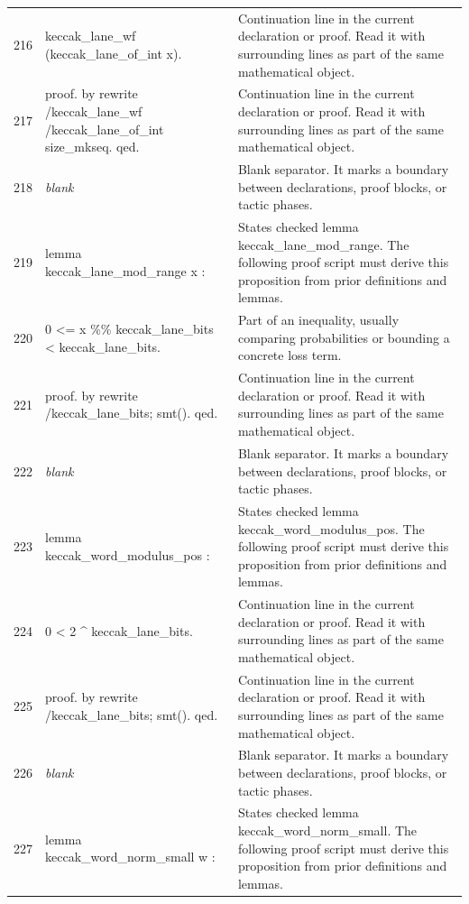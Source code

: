 \documentclass[10pt]{article}
\begin{document}
\begin{longtable}{r L{0.53\textwidth} L{0.37\textwidth}}
216 & {\ttfamily\scriptsize   keccak\_lane\_wf (keccak\_lane\_of\_int x).} & Continuation line in the current declaration or proof.  Read it with surrounding lines as part of the same mathematical object. \\
217 & {\ttfamily\scriptsize proof. by rewrite /keccak\_lane\_wf /keccak\_lane\_of\_int size\_mkseq. qed.} & Continuation line in the current declaration or proof.  Read it with surrounding lines as part of the same mathematical object. \\
218 & {\ttfamily\scriptsize \emph{blank}} & Blank separator.  It marks a boundary between declarations, proof blocks, or tactic phases. \\
219 & {\ttfamily\scriptsize lemma keccak\_lane\_mod\_range x :} & States checked lemma keccak\_lane\_mod\_range.  The following proof script must derive this proposition from prior definitions and lemmas. \\
220 & {\ttfamily\scriptsize   0 <= x \%\% keccak\_lane\_bits < keccak\_lane\_bits.} & Part of an inequality, usually comparing probabilities or bounding a concrete loss term. \\
221 & {\ttfamily\scriptsize proof. by rewrite /keccak\_lane\_bits; smt(). qed.} & Continuation line in the current declaration or proof.  Read it with surrounding lines as part of the same mathematical object. \\
222 & {\ttfamily\scriptsize \emph{blank}} & Blank separator.  It marks a boundary between declarations, proof blocks, or tactic phases. \\
223 & {\ttfamily\scriptsize lemma keccak\_word\_modulus\_pos :} & States checked lemma keccak\_word\_modulus\_pos.  The following proof script must derive this proposition from prior definitions and lemmas. \\
224 & {\ttfamily\scriptsize   0 < 2 \textasciicircum{} keccak\_lane\_bits.} & Continuation line in the current declaration or proof.  Read it with surrounding lines as part of the same mathematical object. \\
225 & {\ttfamily\scriptsize proof. by rewrite /keccak\_lane\_bits; smt(). qed.} & Continuation line in the current declaration or proof.  Read it with surrounding lines as part of the same mathematical object. \\
226 & {\ttfamily\scriptsize \emph{blank}} & Blank separator.  It marks a boundary between declarations, proof blocks, or tactic phases. \\
227 & {\ttfamily\scriptsize lemma keccak\_word\_norm\_small w :} & States checked lemma keccak\_word\_norm\_small.  The following proof script must derive this proposition from prior definitions and lemmas. \\

\end{longtable}
\end{document}
